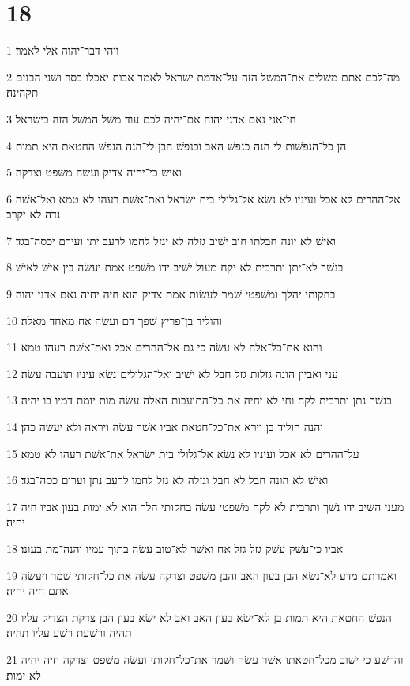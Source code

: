 \chapter{18}

\par 1 ויהי דבר־יהוה אלי לאמר׃
\par 2 מה־לכם אתם משׁלים את־המשׁל הזה על־אדמת ישׂראל לאמר אבות יאכלו בסר ושׁני הבנים תקהינה׃
\par 3 חי־אני נאם אדני יהוה אם־יהיה לכם עוד משׁל המשׁל הזה בישׂראל׃
\par 4 הן כל־הנפשׁות לי הנה כנפשׁ האב וכנפשׁ הבן לי־הנה הנפשׁ החטאת היא תמות׃
\par 5 ואישׁ כי־יהיה צדיק ועשׂה משׁפט וצדקה׃
\par 6 אל־ההרים לא אכל ועיניו לא נשׂא אל־גלולי בית ישׂראל ואת־אשׁת רעהו לא טמא ואל־אשׁה נדה לא יקרב׃
\par 7 ואישׁ לא יונה חבלתו חוב ישׁיב גזלה לא יגזל לחמו לרעב יתן ועירם יכסה־בגד׃
\par 8 בנשׁך לא־יתן ותרבית לא יקח מעול ישׁיב ידו משׁפט אמת יעשׂה בין אישׁ לאישׁ׃
\par 9 בחקותי יהלך ומשׁפטי שׁמר לעשׂות אמת צדיק הוא חיה יחיה נאם אדני יהוה׃
\par 10 והוליד בן־פריץ שׁפך דם ועשׂה אח מאחד מאלה׃
\par 11 והוא את־כל־אלה לא עשׂה כי גם אל־ההרים אכל ואת־אשׁת רעהו טמא׃
\par 12 עני ואביון הונה גזלות גזל חבל לא ישׁיב ואל־הגלולים נשׂא עיניו תועבה עשׂה׃
\par 13 בנשׁך נתן ותרבית לקח וחי לא יחיה את כל־התועבות האלה עשׂה מות יומת דמיו בו יהיה׃
\par 14 והנה הוליד בן וירא את־כל־חטאת אביו אשׁר עשׂה ויראה ולא יעשׂה כהן׃
\par 15 על־ההרים לא אכל ועיניו לא נשׂא אל־גלולי בית ישׂראל את־אשׁת רעהו לא טמא׃
\par 16 ואישׁ לא הונה חבל לא חבל וגזלה לא גזל לחמו לרעב נתן וערום כסה־בגד׃
\par 17 מעני השׁיב ידו נשׁך ותרבית לא לקח משׁפטי עשׂה בחקותי הלך הוא לא ימות בעון אביו חיה יחיה׃
\par 18 אביו כי־עשׁק עשׁק גזל גזל אח ואשׁר לא־טוב עשׂה בתוך עמיו והנה־מת בעונו׃
\par 19 ואמרתם מדע לא־נשׂא הבן בעון האב והבן משׁפט וצדקה עשׂה את כל־חקותי שׁמר ויעשׂה אתם חיה יחיה׃
\par 20 הנפשׁ החטאת היא תמות בן לא־ישׂא בעון האב ואב לא ישׂא בעון הבן צדקת הצדיק עליו תהיה ורשׁעת רשׁע עליו תהיה׃
\par 21 והרשׁע כי ישׁוב מכל־חטאתו אשׁר עשׂה ושׁמר את־כל־חקותי ועשׂה משׁפט וצדקה חיה יחיה לא ימות׃
